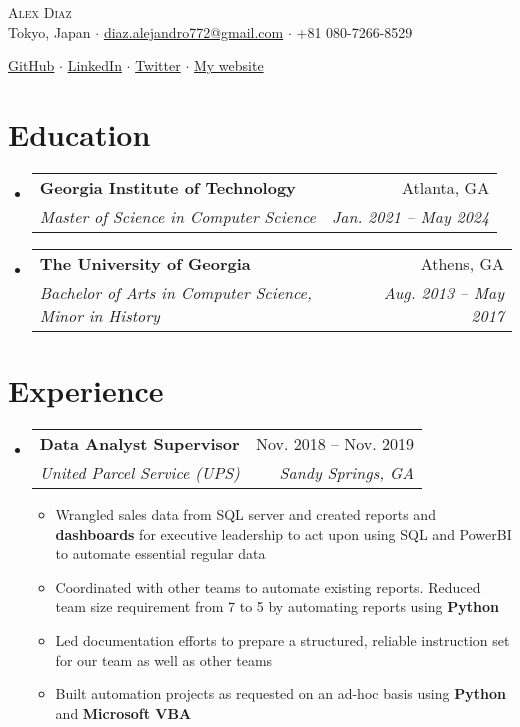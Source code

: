 \documentclass[letterpaper]{article}
\makeatletter
\newcommand{\resumeItem}[1]{
  \item\small{
    {#1 \vspace{-2pt}}
  }
}
\newcommand{\resumeSubheading}[4]{
  \vspace{-2pt}\item
    \begin{tabular*}{0.97\textwidth}[t]{l@{\extracolsep{\fill}}r}
      \textbf{#1} & #2 \\
      \textit{\small#3} & \textit{\small #4} \\
    \end{tabular*}\vspace{-7pt}
}
\newcommand{\resumeSubHeadingListStart}{\begin{itemize}[leftmargin=0.15in, label={}]}
\newcommand{\resumeSubHeadingListEnd}{\end{itemize}}
\newcommand{\resumeItemListStart}{\begin{itemize}}
\newcommand{\resumeItemListEnd}{\end{itemize}\vspace{-5pt}}
\makeatother
\begin{document}
    

\vspace*{-12pt}
\begin{center}
	{\Huge \scshape {Alex Diaz}}\\
	\vspace{1mm}
	\faMapMarker \hspace{.5mm} Tokyo, Japan $\cdot$ 
	\faEnvelope \hspace{.5mm} \href{mailto:diaz.alejandro772@gmail.com}{diaz.alejandro772@gmail.com} $\cdot$ \faMobile \hspace{.5mm} +81 080-7266-8529
		
	\faGithub \hspace{.5mm} \href{https://github.com/calmcoconut}{GitHub} $\cdot$
	\faLinkedin \hspace{.5mm} \href{https://www.linkedin.com/in/diazjalejandro/}{LinkedIn} $\cdot$
	\faTwitter \hspace{.5mm} \href{https://twitter.com/greetingsfriend}{Twitter} $\cdot$
    \faBriefcase \hspace{.5mm} \href{https://calmcoconut.github.io/Alejandro-Diaz-Portfolio/}{My website}
    \\
\end{center}


\section{Education}
  \resumeSubHeadingListStart
    \resumeSubheading
      {Georgia Institute of Technology}{Atlanta, GA}
      {Master of Science in Computer Science}{Jan. 2021 -- May 2024}
    \resumeSubheading
      {The University of Georgia}{Athens, GA}
      {Bachelor of Arts in Computer Science, Minor in History}{Aug. 2013 -- May 2017}
 \resumeSubHeadingListEnd

\section{Experience}

\resumeSubHeadingListStart
  \resumeSubheading
    {Data Analyst Supervisor}{Nov. 2018 -- Nov. 2019}
    {United Parcel Service (UPS)}{Sandy Springs, GA}
    \resumeItemListStart
      \resumeItem{Wrangled sales data from SQL server and created reports and \textbf{dashboards} for executive leadership to act upon using SQL and PowerBI to automate essential regular data}
      \resumeItem{Coordinated with other teams to automate existing reports. Reduced team size requirement from 7 to 5 by automating reports using \textbf{Python}}
      \resumeItem{Led documentation efforts to prepare a structured, reliable instruction set for our team as well as other teams}
      \resumeItem{Built automation projects as requested on an ad-hoc basis using \textbf{Python} and \textbf{Microsoft VBA}}
    \resumeItemListEnd
    \resumeSubHeadingListEnd
\end{document}
